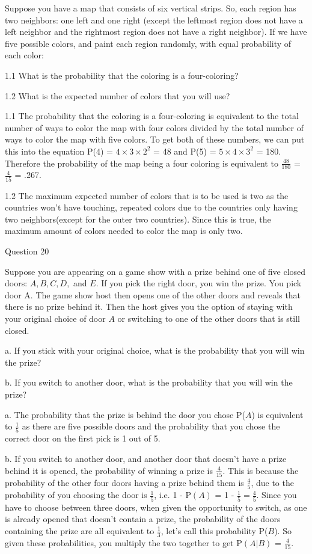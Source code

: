 \documentclass{article}
\author{Joshua Harthan}
\begin{document}
Suppose you have a map that consists of six vertical strips.
So, each region has two neighbors: one left and one right (except the leftmost region does not have a left neighbor and the rightmost region does not have a right neighbor). If we have five possible colors, and paint each region randomly, with equal probability of each color:
\item[]1.1 What is the probability that the coloring is a four-coloring?
\item[]1.2 What is the expected number of colors that you will use?
\item[]1.1 The probability that the coloring is a four-coloring is equivalent to the total number of ways to color the map with four colors divided by the total number of ways to color the map with five colors. To get both of these numbers, we can put this into the equation P(4) = $4 \times 3 \times 2^{2}$ = 48 and P(5) =  $5 \times 4 \times 3^{2}$ = 180. Therefore the probability of the map being a four coloring is equivalent to $\frac{48}{180}$ = $\frac{4}{15}$ = .267.
\item[]1.2 The maximum expected number of colors that is to be used is two as the countries won't have touching, repeated colors due to the countries only having two neighbors(except for the outer two countries). Since this is true, the maximum amount of colors needed to color the map is only two.

\clearpage
{} Question 20
\item[]Suppose you are appearing on a game show with a prize behind one of five closed doors: $A, B, C, D,$ and $E$. If you pick the right door, you win the prize. You pick door A. The game show host then opens one of the other doors and reveals that there is no prize behind it. Then the host gives you the option of staying with your original choice of door $A$ or switching to one of the other doors that is still closed.
\item[]a. If you stick with your original choice, what is the probability that you will win the prize?
\item[]b. If you switch to another door, what is the probability that you will win the prize?
\item[]a. The probability that the prize is behind the door you chose P($A$) is equivalent to $\frac{1}{5}$ as there are five possible doors and the probability that you chose the correct door on the first pick is 1 out of 5.
\item[]b. If you switch to another door, and another door that doesn't have a prize behind it is opened, the probability of winning a prize is $\frac{4}{15}$. This is because the probability of the other four doors having a prize behind them is $\frac{4}{5}$, due to the probability of you choosing the door is $\frac{1}{5}$, i.e. 1 - P$(A)$ = 1 - $\frac{1}{5} = \frac{4}{5}$. Since you have to choose between three doors, when given the opportunity to switch, as one is already opened that doesn't contain a prize, the probability of the doors containing the prize are all equivalent to $\frac{1}{3}$, let's call this probability P($B$). So given these probabilities, you multiply the two together to get P$(A|B)$ = $\frac{4}{15}$.
\end{document}
